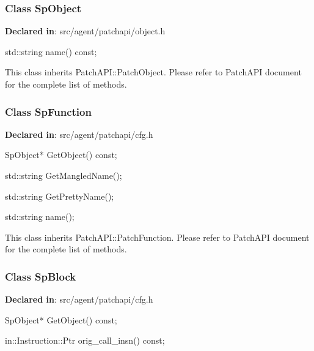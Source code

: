 \subsubsection{Class SpObject}
\textbf{Declared in}: src/agent/patchapi/object.h

\begin{apient}
std::string name() const;
\end{apient}

This class inherits PatchAPI::PatchObject. Please refer to PatchAPI document for
the complete list of methods.

\subsubsection{Class SpFunction}
\textbf{Declared in}: src/agent/patchapi/cfg.h

\begin{apient}
SpObject* GetObject() const;
\end{apient}

\begin{apient}
std::string GetMangledName();
\end{apient}

\begin{apient}
std::string GetPrettyName();
\end{apient}

\begin{apient}
std::string name();
\end{apient}

This class inherits PatchAPI::PatchFunction. Please refer to PatchAPI document
for the complete list of methods.

\subsubsection{Class SpBlock}
\textbf{Declared in}: src/agent/patchapi/cfg.h

\begin{apient}
SpObject* GetObject() const;
\end{apient}

\begin{apient}
in::Instruction::Ptr orig_call_insn() const;
\end{apient}

